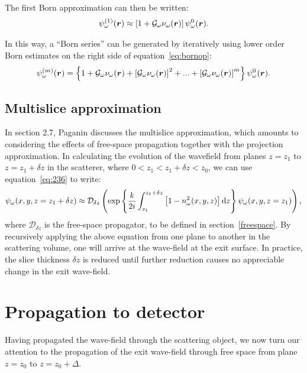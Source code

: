 \documentclass{article}
\begin{document}
The first Born approximation can then be written:
\begin{align}
  \psi_{\omega}^{(1)}(\bm{r}) \approx \left[1 + \mathcal{G}_{\omega}\nu_{\omega}(\bm{r})\right]\psi_{\omega}^0(\bm{r}).
  \label{eq:bornop}
\end{align}

In this way, a ``Born series'' can be generated by iteratively using lower order Born estimates
on the right side of equation~\ref{eq:bornop}:
\begin{align}
  \psi_{\omega}^{(m)}(\bm{r}) = \left\{1 + \mathcal{G}_{\omega}\nu_{\omega}(\bm{r}) + \left[\mathcal{G}_{\omega}\nu_{\omega}(\bm{r})\right]^2 + ... + \left[\mathcal{G}_{\omega}\nu_{\omega}(\bm{r})\right]^m\right\}\psi_{\omega}^0(\bm{r}).
  \label{eq:bornseries}
\end{align}

\subsection{Multislice approximation}\label{multislice}
In section 2.7, Paganin discusses the multislice approximation, which amounts to
considering the effects of free-space propagation together with the projection
approximation. In calculating the evolution of the wavefield from planes $z=z_1$
to $z=z_1 + \delta z$ in the scatterer, where $0 < z_1 < z_1 + \delta z < z_0$,
we can use equation~\ref{eq:236} to write:
\begin{align}
  \psi_{\omega}(x,y,z=z_1 + \delta z) \approx \mathcal{D}_{\delta z}\left(\exp\left\{\frac{k}{2i}\int_{z_1}^{z_1 + \delta z}\left[1 - n_{\omega}^2(x,y,z)\right]\mathrm{d}z\right\}\psi_{\omega}(x,y,z=z_1)\right),
  \label{eq:multisliceapproximation}
\end{align}
where $\mathcal{D}_{\delta z}$ is the free-space propagator, to be defined in
section~\ref{freespace}. By recursively applying the above equation from one
plane to another in the scattering volume, one will arrive at the wave-field at
the exit surface. In practice, the slice thickness $\delta z$ is reduced until
further reduction causes no appreciable change in the exit wave-field. 

\section{Propagation to detector}\label{todetector}
Having propagated the wave-field through the scattering object, we now turn our
attention to the propagation of the exit wave-field through free space from
plane $z=z_0$ to $z = z_0 + \Delta$.
\end{document}
